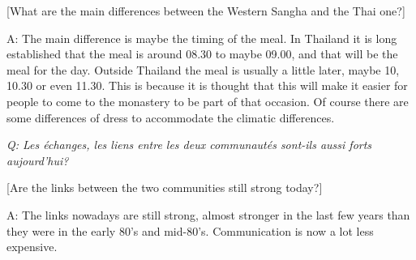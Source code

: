 {[}What are the main differences between the Western Sangha and the Thai
one?{]}

A: The main difference is maybe the timing of the meal. In Thailand it
is long established that the meal is around 08.30 to maybe 09.00, and
that will be the meal for the day. Outside Thailand the meal is usually
a little later, maybe 10, 10.30 or even 11.30. This is because it is
thought that this will make it easier for people to come to the
monastery to be part of that occasion. Of course there are some
differences of dress to accommodate the climatic differences. 

\emph{Q: Les échanges, les liens entre les deux communautés sont-ils
aussi forts aujourd'hui?}

{[}Are the links between the two communities still strong today?{]}

A: The links nowadays are still strong, almost stronger in the last few
years than they were in the early 80's and mid-80's. Communication is
now a lot less expensive. 
